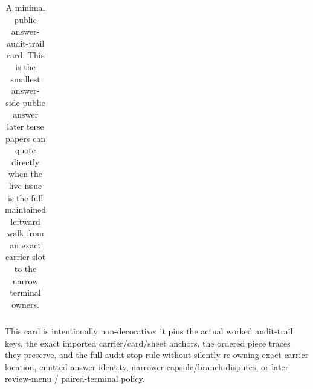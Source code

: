 \documentclass[11pt]{article}
\begin{document}
\begin{table}[t]
\begin{tabularx}{\linewidth}{@{}lX@{}}
\bottomrule
\end{tabularx}
\caption{A minimal public answer-audit-trail card. This is the smallest answer-side public answer later terse papers can quote directly when the live issue is the full maintained leftward walk from an exact carrier slot to the narrow terminal owners.}
\label{tab:minimal-public-answer-audit-trail-card}
\end{table}

This card is intentionally non-decorative: it pins the actual worked audit-trail keys, the exact imported carrier/card/sheet anchors, the ordered piece traces they preserve, and the full-audit stop rule without silently re-owning exact carrier location, emitted-answer identity, narrower capsule/branch disputes, or later review-menu / paired-terminal policy.\cite{series:workedexample}
\end{document}
